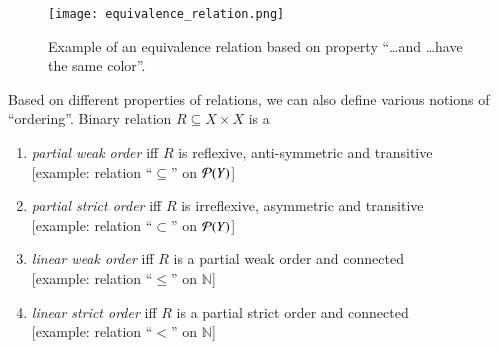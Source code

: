 \documentclass[nobib,nofonts]{tufte-handout}
\newcommand{\mygray}[1]{\textcolor{mygray2}{#1}}
\begin{document}
\begin{figure*}
  \texttt{[image: equivalence\_relation.png]}
  \caption{Example of an equivalence relation based on property ``\dots and \dots have the same
  color''.}
  \label{fig:equivRel}
\end{figure*}

\noindent Based on different properties of relations, we can also define various notions of
``ordering''. Binary relation $R \subseteq X \times X$ is a
\begin{enumerate}
\item[] \emph{partial weak order} iff $R$ is reflexive, anti-symmetric and transitive \\
  \hfill \mygray{[example: relation ``$\subseteq$'' on $\mathcal{P}(Y)$]}
\item[] \emph{partial strict order} iff $R$ is irreflexive, asymmetric and transitive \\
  \hfill \mygray{[example: relation ``$\subset$'' on $\mathcal{P}(Y)$]}
\item[] \emph{linear weak order} iff $R$ is a partial weak order and connected \\
  \hfill \mygray{[example: relation ``$\le$'' on $\mathds{N}$]}
\item[] \emph{linear strict order} iff $R$ is a partial strict order and connected \\
  \hfill \mygray{[example: relation ``$<$'' on $\mathds{N}$]}
\end{enumerate}
\end{document}
